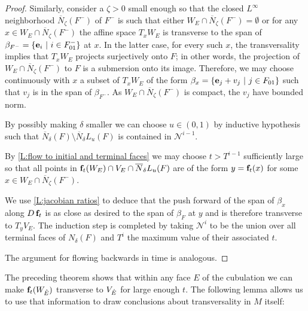 \begin{proof}
	Similarly, consider a $\zeta > 0$ small enough so that the closed $L^\infty$ neighborhood $\overline N_\zeta(F^-)$ of $F^-$ is such that either $W_E \cap \overline N_\zeta(F^-) = \emptyset$ or for any $x \in W_E \cap \overline N_\zeta(F^-)$ the affine space $T_xW_E$ is transverse to the span of $\beta_{F^-} = \{\mathbf{e}_i\ |\ i \in F^-_{01}\}$ at $x$.
	In the latter case, for every such $x$, the transversality implies that $T_xW_E$ projects surjectively onto $F$; in other words, the projection of $W_E \cap \overline N_\zeta(F^-)$ to $F$ is a submersion onto its image.
	Therefore, we may choose continuously with $x$ a subset of $T_xW_E$ of the form $\beta_x = \{\mathbf{e}_j + v_j\ |\ j \in F_{01}\}$ such that $v_j$ is in the span of $\beta_{F^-}$.
	As $W_E \cap \overline N_\zeta(F^-)$ is compact, the $v_j$ have bounded norm.

	By possibly making $\delta$ smaller we can choose $u \in (0, 1)$ by inductive hypothesis such that $\overline N_\delta(F) \setminus \overline N_\delta L_u(F)$ is contained in $\mathcal N^{i-1}$.

	By \cref{L:flow to initial and terminal faces} we may choose $t > T^{i-1}$ sufficiently large so that all points in $\mathbf{f}_t(W_E) \cap V_E \cap \overline N_\delta L_u(F)$ are of the form $y = \mathbf{f}_t(x)$ for some $x \in W_E \cap \overline N_\zeta(F^-)$.

	We use \cref{L:jacobian ratios} to deduce that the push forward of the span of $\beta_x$ along $D\,\mathbf{f}_t$ is as close as desired to the span of $\beta_F$ at $y$ and is therefore transverse to $T_y V_E$.
	The induction step is completed by taking $\mathcal N^i$ to be the union over all terminal faces of $N_\delta(F)$ and $T^i$ the maximum value of their associated $t$.

	The argument for flowing backwards in time is analogous.
\end{proof}

The preceding theorem shows that within any face $E$ of the cubulation we can make $\mathbf{f}_t(W_{\mathring{E}})$ transverse to $V_{\mathring{E}}$ for large enough $t$.
The following lemma allows us to use that information to draw conclusions about transversality in $M$ itself:


